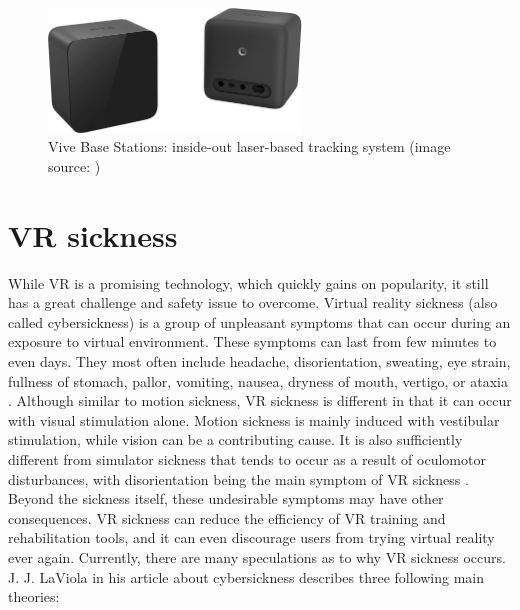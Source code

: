 \begin{figure}[th]
\centering
\includegraphics[width=0.6\textwidth]{img/base_stations.png}
\caption{Vive Base Stations: inside-out laser-based tracking system (image source: \cite{VIVE})}
\label{fig:BASE_STATIONS}
\end{figure}

\section{VR sickness}

While VR is a promising technology, which quickly gains on popularity, it still has a great challenge and safety issue to overcome. Virtual reality sickness (also called cybersickness) is a group of unpleasant symptoms that can occur during an exposure to virtual environment. These symptoms can last from few minutes to even days. They most often include headache, disorientation, sweating, eye strain, fullness of stomach, pallor, vomiting, nausea, dryness of mouth, vertigo, or ataxia \cite{VRSYMPTOMSTIME}. Although similar to motion sickness, VR sickness is different in that it can occur with visual stimulation alone. Motion sickness is mainly induced with vestibular stimulation, while vision can be a contributing cause. It is also sufficiently different from simulator sickness that tends to occur as a result of oculomotor disturbances, with disorientation being the main symptom of VR sickness \cite{VRANDSIMULATORSICKNESS}. Beyond the sickness itself, these undesirable symptoms may have other consequences. VR sickness can reduce the efficiency of VR training and rehabilitation tools, and it can even discourage users from trying virtual reality ever again. Currently, there are many speculations as to why VR sickness occurs. J. J. LaViola in his article about cybersickness \cite{VRSYMPTOMS} describes three following main theories: 

